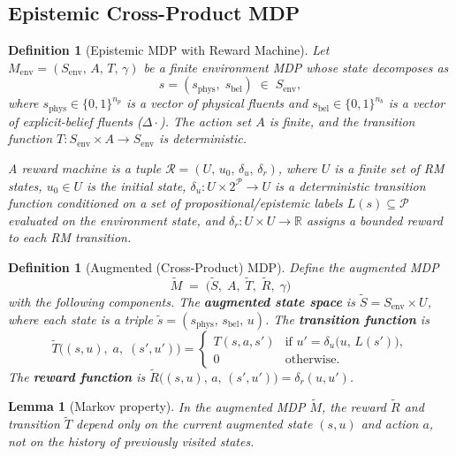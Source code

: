 \documentclass[11pt]{article}
\newtheorem{lemma}[theorem]{Lemma}
\newtheorem{definition}[theorem]{Definition}
\newcommand{\EBel}[1]{\ensuremath{\Delta #1}} %
\begin{document}
\subsection{Epistemic Cross-Product MDP}

\begin{definition}[Epistemic MDP with Reward Machine]
\label{def:epi-mdp}
Let $M_{\mathrm{env}} = (S_{\mathrm{env}},\, A,\, T,\, \gamma)$ be a finite environment MDP whose state decomposes as
\[
    s = (s_{\mathrm{phys}},\; s_{\mathrm{bel}}) \;\in\; S_{\mathrm{env}},
\]
where $s_{\mathrm{phys}} \in \{0,1\}^{n_p}$ is a vector of physical fluents and $s_{\mathrm{bel}} \in \{0,1\}^{n_b}$ is a vector of explicit-belief fluents ($\EBel{\cdot}$).  The action set $A$ is finite, and the transition function $T : S_{\mathrm{env}} \times A \to S_{\mathrm{env}}$ is deterministic.

A \emph{reward machine} is a tuple $\mathcal{R} = (U,\, u_0,\, \delta_u,\, \delta_r)$, where $U$ is a finite set of RM states, $u_0 \in U$ is the initial state, $\delta_u : U \times 2^{\mathcal{P}} \to U$ is a deterministic transition function conditioned on a set of propositional/epistemic labels $L(s) \subseteq \mathcal{P}$ evaluated on the environment state, and $\delta_r : U \times U \to \mathbb{R}$ assigns a bounded reward to each RM transition.
\end{definition}

\begin{definition}[Augmented (Cross-Product) MDP]
\label{def:cross-product}
Define the augmented MDP
\[
    \tilde{M} \;=\; \bigl(\tilde{S},\; A,\; \tilde{T},\; \tilde{R},\; \gamma\bigr)
\]
with the following components.
The \textbf{augmented state space} is $\tilde{S} = S_{\mathrm{env}} \times U$, where each state is a triple $\tilde{s} = (s_{\mathrm{phys}},\, s_{\mathrm{bel}},\, u)$.
The \textbf{transition function} is
\[
    \tilde{T}\bigl((s, u),\; a,\; (s', u')\bigr) =
    \begin{cases}
        T(s, a, s') & \text{if } u' = \delta_u\bigl(u,\, L(s')\bigr), \\
        0 & \text{otherwise}.
    \end{cases}
\]
The \textbf{reward function} is
$\tilde{R}\bigl((s, u),\, a,\, (s', u')\bigr) = \delta_r(u, u')$.
\end{definition}

\begin{lemma}[Markov property]
\label{lem:markov}
In the augmented MDP $\tilde{M}$, the reward $\tilde{R}$ and transition $\tilde{T}$ depend only on the current augmented state $(s, u)$ and action $a$, not on the history of previously visited states.
\end{lemma}
\end{document}
